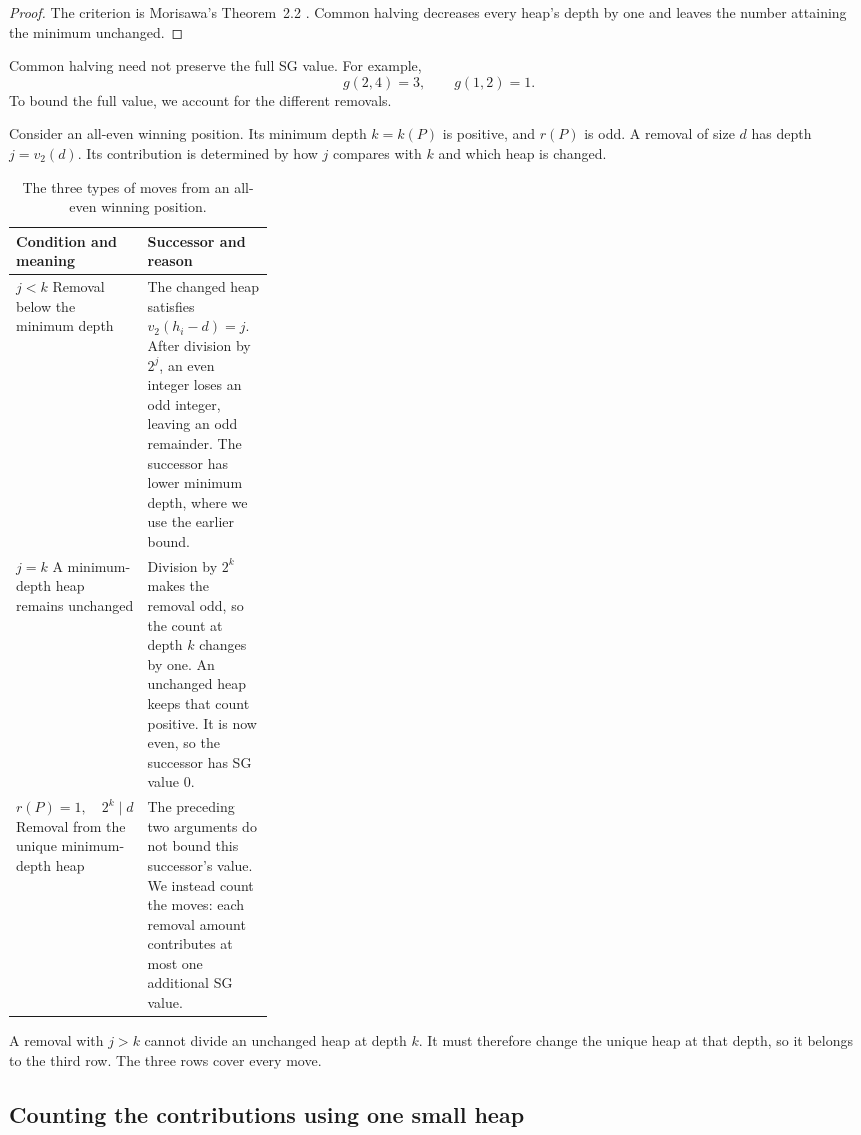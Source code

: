 \documentclass[11pt]{article}
\begin{document}
\begin{proof}
The criterion is Morisawa's Theorem~2.2
\cite{Morisawa2026}. Common halving decreases every heap's
depth by one and leaves the number attaining the minimum
unchanged.
\end{proof}

Common halving need not preserve the full SG value. For example,
\[
 g(2,4)=3,
 \qquad
 g(1,2)=1.
\]
To bound the full value, we account for the different removals.

Consider an all-even winning position. Its minimum depth
$k=k(P)$ is positive, and $r(P)$ is odd. A removal of size
$d$ has depth $j=v_2(d)$. Its contribution is determined by
how $j$ compares with $k$ and which heap is changed.

\begin{table}[H]
\centering
\begin{tabularx}{\linewidth}{@{}L{0.30\linewidth}Y@{}}
\toprule
Condition and meaning & Successor and reason \\
\midrule
$j<k$\newline
Removal below the minimum depth
  & The changed heap satisfies $v_2(h_i-d)=j$.
    After division by $2^j$, an even integer loses an odd
    integer, leaving an odd remainder. The successor has
    lower minimum depth, where we use the earlier bound. \\
\addlinespace[9pt]
$j=k$\newline
A minimum-depth heap remains unchanged
  & Division by $2^k$ makes the removal odd, so the count
    at depth $k$ changes by one. An unchanged heap keeps
    that count positive. It is now even, so the successor
    has SG value $0$. \\
\addlinespace[9pt]
$r(P)=1,\quad 2^k\mid d$\newline
Removal from the unique minimum-depth heap
  & The preceding two arguments do not bound this successor's
    value. We instead count the moves: each removal amount
    contributes at most one additional SG value. \\
\bottomrule
\end{tabularx}
\caption{The three types of moves from an all-even winning position.}
\label{tab:moves}
\end{table}

A removal with $j>k$ cannot divide an unchanged heap at depth
$k$. It must therefore change the unique heap at that depth,
so it belongs to the third row. The three rows cover every move.

\subsection{Counting the contributions using one small heap}
\end{document}
